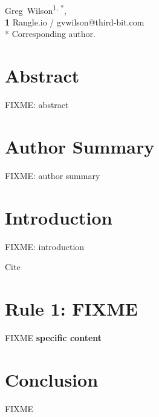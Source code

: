 \newcommand{\fixme}[2]{\textsc{\textbf{{#1}: {#2}}}}
\newcommand{\recommend}[1]{\textit{#1}}
\newcommand{\withurl}[2]{{#1}\footnote{\texttt{#2}}}
\newcommand{\rulemajor}[1]{\section{#1}}
\newcommand{\ruleminor}[1]{\textbf{#1}}

\vspace*{0.2in}

\begin{flushleft}
{\Large
\textbf{}
}
\newline
\\
{Greg~Wilson}\textsuperscript{1, *},
\\
\textbf{1} Rangle.io / gvwilson@third-bit.com
\\
* Corresponding author.
\end{flushleft}

\section*{Abstract}

FIXME: abstract

\section*{Author Summary}

FIXME: author summary

\section*{Introduction}

FIXME: introduction

Cite \cite{steinmacher2015}

\rulemajor{Rule 1: FIXME}

FIXME \ruleminor{specific content}

\section*{Conclusion}

FIXME




